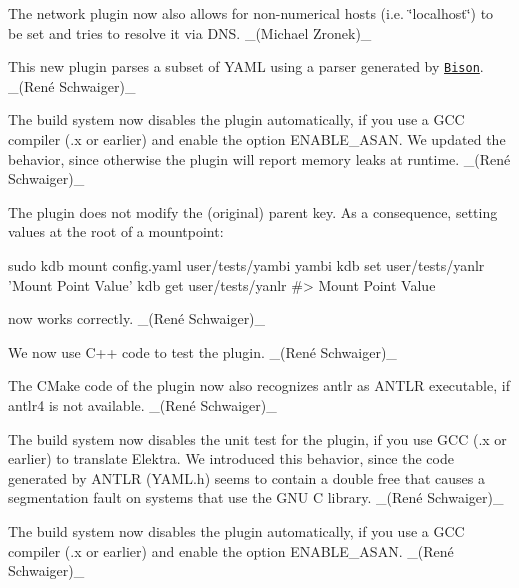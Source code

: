 The {\ttfamily network} plugin now also allows for non-\/numerical hosts (i.\+e. \char`\"{}localhost\char`\"{}) to be set and tries to resolve it via D\+NS. \+\_\+(\+Michael Zronek)\+\_\+

This new plugin parses a subset of Y\+A\+ML using a parser generated by \href{https://www.gnu.org/software/bison}{\tt Bison}. \+\_\+(René Schwaiger)\+\_\+

The build system now disables the plugin automatically, if you use a G\+CC compiler ({.\+x} or earlier) and enable the option {\ttfamily E\+N\+A\+B\+L\+E\+\_\+\+A\+S\+AN}. We updated the behavior, since otherwise the plugin will report memory leaks at runtime. \+\_\+(René Schwaiger)\+\_\+


\begin{DoxyItemize}
\item The plugin does not modify the (original) parent key. As a consequence, setting values at the root of a mountpoint\+:
\end{DoxyItemize}


\begin{DoxyCode}
sudo kdb mount config.yaml user/tests/yambi yambi
kdb set user/tests/yanlr 'Mount Point Value'
kdb get user/tests/yanlr
#> Mount Point Value
\end{DoxyCode}


now works correctly. \+\_\+(René Schwaiger)\+\_\+


\begin{DoxyItemize}
\item We now use C++ code to test the plugin. \+\_\+(René Schwaiger)\+\_\+
\item The C\+Make code of the plugin now also recognizes {\ttfamily antlr} as A\+N\+T\+LR executable, if {\ttfamily antlr4} is not available. \+\_\+(René Schwaiger)\+\_\+
\item The build system now disables the unit test for the plugin, if you use G\+CC ({.\+x} or earlier) to translate Elektra. We introduced this behavior, since the code generated by A\+N\+T\+LR ({\ttfamily Y\+A\+M\+L.\+h}) seems to contain a double free that causes a segmentation fault on systems that use the G\+NU C library. \+\_\+(René Schwaiger)\+\_\+
\item The build system now disables the plugin automatically, if you use a G\+CC compiler ({.\+x} or earlier) and enable the option {\ttfamily E\+N\+A\+B\+L\+E\+\_\+\+A\+S\+AN}. \+\_\+(René Schwaiger)\+\_\+
\end{DoxyItemize}


